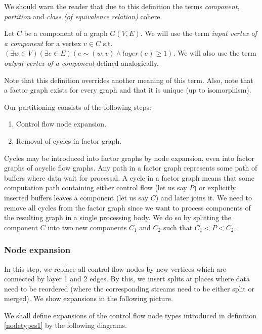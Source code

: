 \begin{rem} 
  We should warn the reader that due to this definition the terms \emph{component}, \emph{partition} and \emph{class (of equivalence relation)} cohere.
\end{rem}

  Let $C$ be a component of a graph $G(V,E)$. We will use the term \emph{input vertex of a component} for a vertex $v \in C$ s.t. $(\exists w \in V)(\exists e \in E)( e \sim (w,v) \land layer(e) \geq 1 )$. We will also use the term \emph{output vertex of a component} defined analogically.
\myenddef

Note that this definition overrides another meaning of this term. Also, note that a factor graph exists for every graph and that it is unique (up to isomorphism).

Our partitioning consists of the following steps:
\begin{enumerate}
  \item Control flow node expansion. 
  \item Removal of cycles in factor graph. 
\end{enumerate}

Cycles may be introduced into factor graphs by node expansion, even into factor graphs of acyclic flow graphs. Any path in a factor graph represents some path of buffers where data wait for processal. A cycle in a factor graph means that some computation path containing either control flow (let us say $P$) or explicitly inserted buffers leaves a component (let us say $C$) and later joins it. We need to remove all cycles from the factor graph since we want to process components of the resulting graph in a single processing body. We do so by splitting the component $C$ into two new components $C_1$ and $C_2$ such that $C_1 < P < C_2$.

\subsubsection{Node expansion}

In this step, we replace all control flow nodes by new vertices which are connected by layer 1 and 2 edges. By this, we insert splits at places where data need to be reordered (where the corresponding streams need to be either split or merged). We show expansions in the following picture.

We shall define expansions of the control flow node types introduced in definition \ref{nodetypes1} by the following diagrams.
\myenddef

